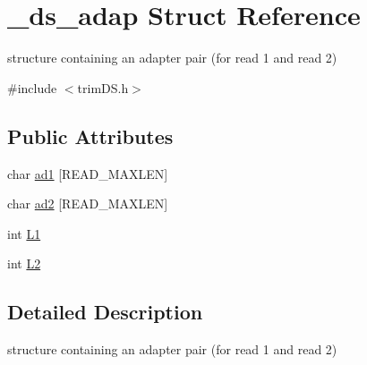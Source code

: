 \hypertarget{struct__ds__adap}{\section{\+\_\+ds\+\_\+adap Struct Reference}
\label{struct__ds__adap}
}


structure containing an adapter pair (for read 1 and read 2)  




{\ttfamily \#include $<$trim\+D\+S.\+h$>$}

\subsection*{Public Attributes}
\begin{DoxyCompactItemize}
\item 
char \hyperlink{struct__ds__adap_ae14dd70536b6c7e795261cafad1c2d72}{ad1} \mbox{[}R\+E\+A\+D\+\_\+\+M\+A\+X\+L\+E\+N\mbox{]}
\item 
char \hyperlink{struct__ds__adap_a6206cafdf0cfea58ce84c08515def558}{ad2} \mbox{[}R\+E\+A\+D\+\_\+\+M\+A\+X\+L\+E\+N\mbox{]}
\item 
int \hyperlink{struct__ds__adap_a57266ed9fb1b73a20f98b8df2235f0c8}{L1}
\item 
int \hyperlink{struct__ds__adap_a80926b243dd1120a43bd9b8e00774b99}{L2}
\end{DoxyCompactItemize}


\subsection{Detailed Description}
structure containing an adapter pair (for read 1 and read 2) 

